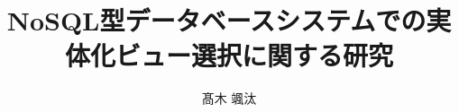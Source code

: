 \usepackage{graphicx} %
\usepackage{epsfig} %
\usepackage{src/class/mediabb} %

\usepackage{times} %
\usepackage{src/class/docmute} %

\setcounter{tocdepth}{3}
\setcounter{page}{-1}

\setlength{\oddsidemargin}{0.1in}
\setlength{\evensidemargin}{0.1in}
\setlength{\topmargin}{0in}
\setlength{\textwidth}{6in}
\setlength{\parskip}{0em}
\setlength{\topsep}{0em}


\usepackage{src/class/mast-jp-sjis}

\title{NoSQL型データベースシステムでの実体化ビュー選択に関する研究}
\author{髙木 颯汰}

\majorfield{ } 
